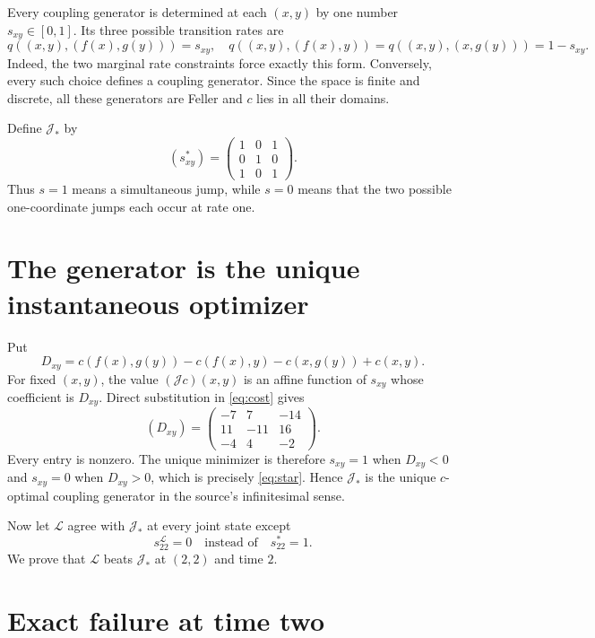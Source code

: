 \documentclass[11pt]{article}
\begin{document}
Every coupling generator is determined at each $(x,y)$ by one number
$s_{xy}\in[0,1]$.  Its three possible transition rates are
\[
 q((x,y),(f(x),g(y)))=s_{xy},\quad
 q((x,y),(f(x),y))=q((x,y),(x,g(y)))=1-s_{xy}.
\]
Indeed, the two marginal rate constraints force exactly this form.  Conversely,
every such choice defines a coupling generator.  Since the space is finite and
discrete, all these generators are Feller and $c$ lies in all their domains.

Define $\mathcal J_*$ by
\begin{equation}\label{eq:star}
 (s^*_{xy})=
 \begin{pmatrix}1&0&1\\0&1&0\\1&0&1\end{pmatrix}.
\end{equation}
Thus $s=1$ means a simultaneous jump, while $s=0$ means that the two possible
one-coordinate jumps each occur at rate one.

\section{The generator is the unique instantaneous optimizer}

Put
\[
 D_{xy}=c(f(x),g(y))-c(f(x),y)-c(x,g(y))+c(x,y).
\]
For fixed $(x,y)$, the value $(\mathcal Jc)(x,y)$ is an affine function of
$s_{xy}$ whose coefficient is $D_{xy}$.  Direct substitution in
\eqref{eq:cost} gives
\begin{equation}\label{eq:D}
 (D_{xy})=
 \begin{pmatrix}-7&7&-14\\11&-11&16\\-4&4&-2\end{pmatrix}.
\end{equation}
Every entry is nonzero.  The unique minimizer is therefore $s_{xy}=1$ when
$D_{xy}<0$ and $s_{xy}=0$ when $D_{xy}>0$, which is precisely
\eqref{eq:star}.  Hence $\mathcal J_*$ is the unique $c$-optimal coupling
generator in the source's infinitesimal sense.

Now let $\mathcal L$ agree with $\mathcal J_*$ at every joint state except
\[
 s^{\mathcal L}_{22}=0
 \quad\text{instead of}\quad s^*_{22}=1.
\]
We prove that $\mathcal L$ beats $\mathcal J_*$ at $(2,2)$ and time $2$.

\section{Exact failure at time two}
\end{document}
